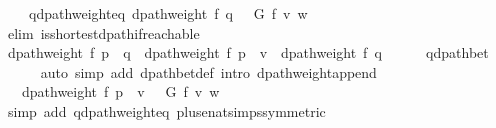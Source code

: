 \begin{isabellebody}
\ \ \ \ q{\isacharprime}{\kern0pt}{\isacharunderscore}{\kern0pt}dpath{\isacharunderscore}{\kern0pt}weight{\isacharunderscore}{\kern0pt}eq{\isacharunderscore}{\kern0pt}{\isasymdelta}{\isacharcolon}{\kern0pt}\ {\isachardoublequoteopen}dpath{\isacharunderscore}{\kern0pt}weight\ f\ q{\isacharprime}{\kern0pt}\ {\isacharequal}{\kern0pt}\ {\isasymdelta}\ G\ f\ v\ w{\isachardoublequoteclose}\isanewline
\ \ \ \ \isamarkupfalse%
\ {\isacharparenleft}{\kern0pt}elim\ is{\isacharunderscore}{\kern0pt}shortest{\isacharunderscore}{\kern0pt}dpath{\isacharunderscore}{\kern0pt}if{\isacharunderscore}{\kern0pt}reachable{\isacharparenright}{\kern0pt}\isanewline
\isanewline
\ \ \isamarkupfalse%
\ {\isachardoublequoteopen}dpath{\isacharunderscore}{\kern0pt}weight\ f\ {\isacharparenleft}{\kern0pt}p\ {\isacharat}{\kern0pt}\ q{\isacharprime}{\kern0pt}{\isacharparenright}{\kern0pt}\ {\isacharequal}{\kern0pt}\ dpath{\isacharunderscore}{\kern0pt}weight\ f\ {\isacharparenleft}{\kern0pt}p\ {\isacharat}{\kern0pt}\ {\isacharbrackleft}{\kern0pt}v{\isacharbrackright}{\kern0pt}{\isacharparenright}{\kern0pt}\ {\isacharplus}{\kern0pt}\ dpath{\isacharunderscore}{\kern0pt}weight\ f\ q{\isacharprime}{\kern0pt}{\isachardoublequoteclose}\isanewline
\ \ \ \ \isamarkupfalse%
\ q{\isacharprime}{\kern0pt}{\isacharunderscore}{\kern0pt}dpath{\isacharunderscore}{\kern0pt}bet\ \isanewline
\ \ \ \ \isamarkupfalse%
\ {\isacharparenleft}{\kern0pt}auto\ simp\ add{\isacharcolon}{\kern0pt}\ dpath{\isacharunderscore}{\kern0pt}bet{\isacharunderscore}{\kern0pt}def\ intro{\isacharcolon}{\kern0pt}\ dpath{\isacharunderscore}{\kern0pt}weight{\isacharunderscore}{\kern0pt}append{\isacharunderscore}{\kern0pt}{}{\isacharparenright}{\kern0pt}\isanewline
\ \ \isamarkupfalse%
\ \isamarkupfalse%
\ {\isachardoublequoteopen}{\isachardot}{\kern0pt}{\isachardot}{\kern0pt}{\isachardot}{\kern0pt}\ {\isacharequal}{\kern0pt}\ dpath{\isacharunderscore}{\kern0pt}weight\ f\ {\isacharparenleft}{\kern0pt}p\ {\isacharat}{\kern0pt}\ {\isacharbrackleft}{\kern0pt}v{\isacharbrackright}{\kern0pt}{\isacharparenright}{\kern0pt}\ {\isacharplus}{\kern0pt}\ {\isasymdelta}\ G\ f\ v\ w{\isachardoublequoteclose}\isanewline
\ \ \ \ \isamarkupfalse%
\ {\isacharparenleft}{\kern0pt}simp\ add{\isacharcolon}{\kern0pt}\ q{\isacharprime}{\kern0pt}{\isacharunderscore}{\kern0pt}dpath{\isacharunderscore}{\kern0pt}weight{\isacharunderscore}{\kern0pt}eq{\isacharunderscore}{\kern0pt}{\isasymdelta}\ plus{\isacharunderscore}{\kern0pt}enat{\isacharunderscore}{\kern0pt}simps{\isacharparenleft}{\kern0pt}{}{\isacharparenright}{\kern0pt}{\isacharbrackleft}{\kern0pt}symmetric{\isacharbrackright}{\kern0pt}{\isacharparenright}{\kern0pt}\isanewline

\end{isabellebody}
